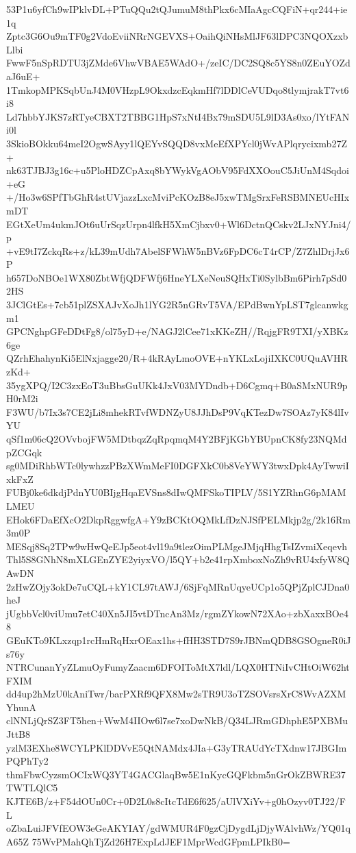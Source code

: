 53P1u6yfCh9wIPklvDL+PTuQQu2tQJumuM8thPkx6cMIaAgcCQFiN+qr244+ie1q
Zptc3G6Ou9mTF0g2VdoEviiNRrNGEVXS+OaihQiNHsMlJF63lDPC3NQOXzxbLlbi
FwwF5nSpRDTU3jZMde6VhwVBAE5WAdO+/zeIC/DC2SQ8c5YS8n0ZEuYOZdaJ6uE+
1TmkopMPKSqbUnJ4M0VHzpL9OkxdzcEqkmHf7lDDlCeVUDqo8tlymjrakT7vt6i8
Ld7hbbYJKS7zRTyeCBXT2TBBG1HpS7xNtI4Bx79mSDU5L9lD3As0xo/lYtFANi0l
3SkioBOkku64meI2OgwSAyy1lQEYvSQQD8vxMeEfXPYcl0jWvAPlqrycixmb27Z+
nk63TJBJ3g16c+u5PloHDZCpAxq8bYWykVgAObV95FdXXOouC5JiUnM4Sqdoi+eG
+/Ho3w6SPfTbGhR4stUVjazzLxcMviPcKOzB8eJ5xwTMgSrxFeRSBMNEUcHIxmDT
EGtXeUm4ukmJOt6uUrSqzUrpn4lfkH5XmCjbxv0+Wl6DctnQCskv2LJxNYJni4/p
+vE9tI7ZckqRs+z/kL39mUdh7AbelSFWhW5nBVz6FpDC6cT4rCP/Z7ZhlDrjJx6P
h657DoNBOe1WX80ZbtWfjQDFWfj6HneYLXeNeuSQHxTi0SylbBm6Pirh7pSd02HS
3JClGtEs+7cb51plZSXAJvXoJh1lYG2R5nGRvT5VA/EPdBwnYpLST7glcanwkgm1
GPCNghpGFeDDtFg8/ol75yD+e/NAGJ2lCee71xKKeZH//RqjgFR9TXI/yXBKz6ge
QZrhEhahynKi5ElNxjagge20/R+4kRAyLmoOVE+nYKLxLojiIXKC0UQuAVHRzKd+
35ygXPQ/I2C3zxEoT3uBbsGuUKk4JxV03MYDndb+D6Cgmq+B0aSMxNUR9pH0rM2i
F3WU/b7Ix3s7CE2jLi8mhekRTvfWDNZyU8JJhDsP9VqKTezDw7SOAz7yK84lIvYU
qSf1m06cQ2OVvbojFW5MDtbqzZqRpqmqM4Y2BFjKGbYBUpnCK8fy23NQMdpZCGqk
sg0MDiRhbWTc0lywhzzPBzXWmMeFI0DGFXkC0b8VeYWY3twxDpk4AyTwwiIxkFxZ
FUBj0ke6dkdjPdnYU0BIjgHqaEVSns8dIwQMFSkoTIPLV/5S1YZRhnG6pMAMLMEU
EHok6FDaEfXcO2DkpRggwfgA+Y9zBCKtOQMkLfDzNJSfPELMkjp2g/2k16Rm3m0P
MESqj8Sq2TPw9wHwQeEJp5eot4vl19a9tlezOimPLMgeJMjqHhgTsIZvmiXeqevh
Thl5S8GNhN8mXLGEnZYE2yiyxVO/l5QY+b2e41rpXmboxNoZh9vRU4xfyW8QAwDN
2zHwZOjy3okDe7uCQL+kY1CL97tAWJ/6SjFqMRnUqyeUCp1o5QPjZplCJDna0heJ
jUgbbVcl0viUmu7etC40Xn5JI5vtDTncAn3Mz/rgmZYkowN72XAo+zbXaxxBOe48
GEuKTo9KLxzqp1rcHmRqHxrOEax1hs+fHH3STD7S9rJBNmQDB8GSOgneR0iJs76y
NTRCunanYyZLmuOyFumyZaacm6DFOIToMtX7ldl/LQX0HTNiIvCHtOiW62htFXIM
dd4up2hMzU0kAniTwr/barPXRf9QFX8Mw2sTR9U3oTZSOVsrsXrC8WvAZXMYhunA
clNNLjQrSZ3FT5hen+WwM4IIOw6l7se7xoDwNkB/Q34LJRmGDhphE5PXBMuJttB8
yzlM3EXhe8WCYLPKlDDVvE5QtNAMdx4JIa+G3yTRAUdYcTXdnw17JBGImPQPhTy2
thmFbwCyzsmOCIxWQ3YT4GACGlaqBw5E1nKycGQFkbm5nGrOkZBWRE37TWTLQlC5
KJTE6B/z+F54dOUn0Cr+0D2L0s8cItcTdE6f625/aUlVXiYv+g0hOzyv0TJ22/FL
oZbaLuiJFVfEOW3eGeAKYIAY/gdWMUR4F0gzCjDygdLjDjyWAlvhWz/YQ01qA65Z
75WvPMahQhTjZd26H7ExpLdJEF1MprWcdGFpmLPIkB0=
